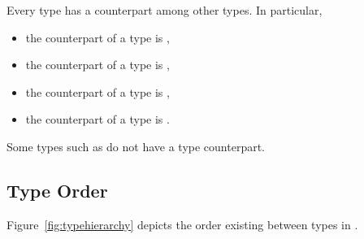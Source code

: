 Every \Set type has a counterpart among other types. In particular,
\begin{itemize}
\item[] the counterpart of a \BoolSet type is \Boolean, 
\item[] the counterpart of a \IntSet type is \Integer, 
\item[] the counterpart of a \SymbSet type is \SymbEnum, 
\item[] the counterpart of a \IntSymbSet type is \IntSymbEnum. 
\end{itemize}
Some types such as \Word %
do not have a \Set type counterpart.


\subsection{Type Order}
\label{Type Order}
%
Figure~\ref{fig:typehierarchy} depicts the order existing between
types in \nusmv.

